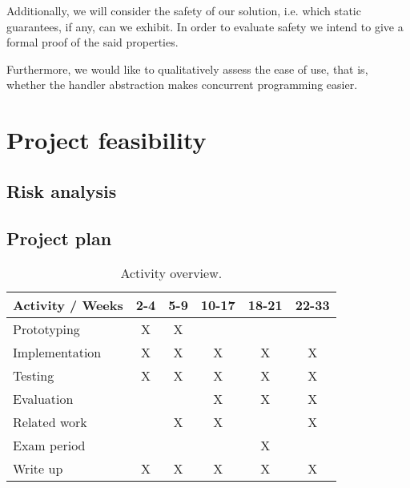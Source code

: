 \documentclass[preprint,10pt,numbers]{sigplanconf}
\begin{document}
Additionally, we will consider the safety of our solution, i.e. which static guarantees, if any, can we exhibit. In order to evaluate safety we intend to give a formal proof of the said properties.

Furthermore, we would like to qualitatively assess the ease of use, that is, whether the handler abstraction makes concurrent programming easier.

  \section{Project feasibility}
  \subsection{Risk analysis}

  \subsection{Project plan}
  \begin{table}[H]
    \centering
    \begin{tabular}{ | l | c | c | c | c | c | }
      \hline
      \multicolumn{1}{|c|}{Activity / Weeks} & 2-4 & 5-9 & 10-17 & 18-21 & 22-33 \\
      \hline
      Prototyping    & X & X & & & \\
      \hline
      Implementation & X & X & X & X & X \\
      \hline
      Testing        & X & X & X & X & X \\
      \hline
      Evaluation     &   &   & X & X & X \\
      \hline
      Related work   &   & X & X &   & X \\
      \hline
      Exam period    &   &   &   & X &   \\
      \hline
      Write up       & X & X & X & X & X  \\
      \hline
    \end{tabular}\caption{Activity overview.}
  \end{table}

\softraggedright
\nocite{*}

\end{document}
